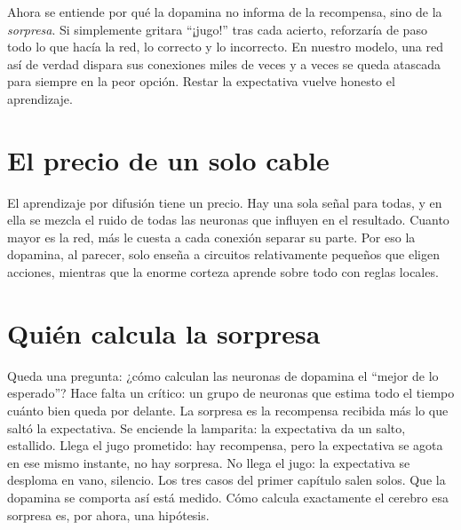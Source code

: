 Ahora se entiende por qué la dopamina no informa de la recompensa, sino de la \emph{sorpresa}. Si simplemente gritara “¡jugo!” tras cada acierto, reforzaría de paso todo lo que hacía la red, lo correcto y lo incorrecto. En nuestro modelo, una red así de verdad dispara sus conexiones miles de veces y a veces se queda atascada para siempre en la peor opción. Restar la expectativa vuelve honesto el aprendizaje.

\section*{El precio de un solo cable}

El aprendizaje por difusión tiene un precio. Hay una sola señal para todas, y en ella se mezcla el ruido de todas las neuronas que influyen en el resultado. Cuanto mayor es la red, más le cuesta a cada conexión separar su parte. Por eso la dopamina, al parecer, solo enseña a circuitos relativamente pequeños que eligen acciones, mientras que la enorme corteza aprende sobre todo con reglas locales.

\section*{Quién calcula la sorpresa}

Queda una pregunta: ¿cómo calculan las neuronas de dopamina el “mejor de lo esperado”? Hace falta un crítico: un grupo de neuronas que estima todo el tiempo cuánto bien queda por delante. La sorpresa es la recompensa recibida más lo que saltó la expectativa. Se enciende la lamparita: la expectativa da un salto, estallido. Llega el jugo prometido: hay recompensa, pero la expectativa se agota en ese mismo instante, no hay sorpresa. No llega el jugo: la expectativa se desploma en vano, silencio. Los tres casos del primer capítulo salen solos. Que la dopamina se comporta así está medido. Cómo calcula exactamente el cerebro esa sorpresa es, por ahora, una hipótesis.

